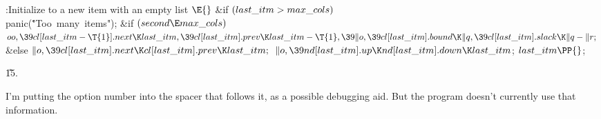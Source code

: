 \B{}:Initialize  to a new item with an empty list%
\X${}\E{}$\6
\&{if} ${}(\\{last\_itm}>\\{max\_cols}){}$\1\5
\\{panic}(\.{"Too\ many\ items"});\2\6
\&{if} ${}(\\{second}\E\\{max\_cols}){}$\1\5
${}\\{oo},\39\\{cl}[\\{last\_itm}-\T{1}].\\{next}\K\\{last\_itm},\39\\{cl}[%
\\{last\_itm}].\\{prev}\K\\{last\_itm}-\T{1},\39\|o,\39\\{cl}[\\{last\_itm}].%
\\{bound}\K\|q,\39\\{cl}[\\{last\_itm}].\\{slack}\K\|q-\|r;{}$\2\6
\&{else}\1\5
${}\|o,\39\\{cl}[\\{last\_itm}].\\{next}\K\\{cl}[\\{last\_itm}].\\{prev}\K%
\\{last\_itm};{}$\2\6
${}\|o,\39\\{nd}[\\{last\_itm}].\\{up}\K\\{nd}[\\{last\_itm}].\\{down}\K\\{last%
\_itm}{}$;\6
${}\\{last\_itm}\PP{}$;\par
\U15.\fi

I'm putting the option number into the spacer that follows it, as a
possible debugging aid. But the program doesn't currently use that information.

